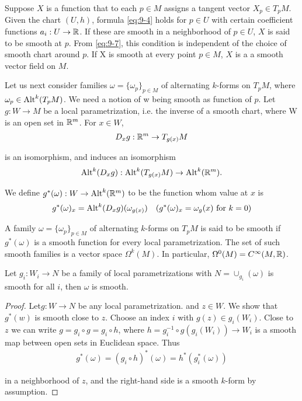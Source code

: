 Suppose $X$ is a function that to each $p\in M$ assigns a tangent vector $X_p\in T_pM$.
Given the chart $(U, h)$, formula \eqref{eq:9-4} holds for $p\in U$ with certain coefficient
functions $a_i: U\to \mathbb{R}$. If these are smooth in a neighborhood of $p\in U$, $X$ is
said to be smooth at $p$. From \eqref{eq:9-7}, this condition is independent of the choice of
smooth chart around $p$. If X is smooth at every point $p\in M$, $X$ is a a smooth
vector field on $M$.

Let us next consider families $\omega=\{\omega_p\}_{p\in M}$ of alternating $k$-forms on $T_pM$, 
where $\omega_p\in \operatorname{Alt}^k(T_pM)$. We need a notion of w being smooth as function of $p$. Let
$g:W\to M$ be a local parametrization, i.e. the inverse of a smooth chart, where
W is an open set in $\mathbb{R}^m$. For $x\in W$,
\begin{align*}
  D_xg:\mathbb{R}^m\to T_{g(x)}M
\end{align*}

is an isomorphism, and induces an isomorphism 
\begin{align*}
  \operatorname{Alt}^k(D_xg):\operatorname{Alt}^k(T_{g(x)}M)\to\operatorname{Alt}^k(\mathbb{R}^m).
\end{align*}

We define $g^*(\omega):W\to \operatorname{Alt}^k(\mathbb{R}^m)$ to be the function whom value at $x$ is 
\begin{align*}
  g^*(\omega)_x = \operatorname{Alt}^k(D_xg)(\omega_{g(x)})
  && 
  (g^*(\omega)_x = \omega_g(x) \text{ for } k = 0)
\end{align*}

\begin{definition}\label{def:9-5}
  A family $\omega = \{\omega_p\}_{p\in M}$ of alternating $k$-forms on $T_pM$ is said
to be smooth if $g^*(\omega)$ is a smooth function for every local parametrization. The
set of such smooth families is a vector space $\Omega^k(M)$. In particular, $\Omega^0(M)
= C^\infty(M, \mathbb{R})$.
\end{definition}

\begin{lemma}\label{lemma:9-6}
  Let $g_i:W_i\to N$ be a family of local parametrizations with $N = \cup_{g_i}(\omega)$ is 
  smooth for all $i$, then $\omega$ is smooth.
\end{lemma}

\begin{proof}
  Let$ g:W\to N$ be any local parametrization. and $z\in W$. We show that
$g^*(w)$ is smooth close to $z$. Choose an index $i$ with $g(z)\in g_i(W_i)$. 
Close to $z$ we can write $g=g_i\circ g = g_i\circ h$, where $h=g_i^{-1}\circ g(g_i(W_i))\to 
W_i$ is a smooth map between open sets in Euclidean space. Thus 
\begin{align*}
  g^*(\omega) = (g_i\circ h)^*(\omega) = h^*(g_i^*(\omega))
\end{align*}

in a neighborhood of $z$, and the right-hand side is a smooth $k$-form by assumption.
\end{proof}


